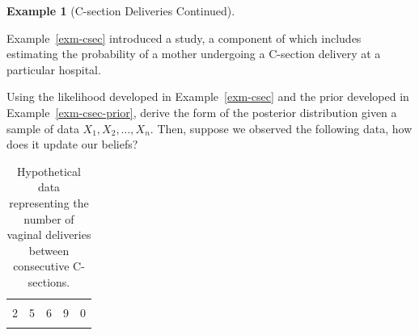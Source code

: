 \documentclass[
  letterpaper,
  DIV=11,
  numbers=noendperiod]{scrreprt}
\theoremstyle{definition}
\theoremstyle{plain}
\theoremstyle{definition}
\newtheorem{example}{Example}[chapter]
\theoremstyle{remark}
\begin{document}
\begin{example}[C-section Deliveries
Continued]\protect\hypertarget{exm-csec-posterior}{}\label{exm-csec-posterior}

Example~\ref{exm-csec} introduced a study, a component of which includes
estimating the probability of a mother undergoing a C-section delivery
at a particular hospital.

Using the likelihood developed in Example~\ref{exm-csec} and the prior
developed in Example~\ref{exm-csec-prior}, derive the form of the
posterior distribution given a sample of data \(X_1, X_2, \dotsc, X_n\).
Then, suppose we observed the following data, how does it update our
beliefs?

\hypertarget{tbl-csec-data}{}
\begin{table}
\caption{\label{tbl-csec-data}Hypothetical data representing the number of vaginal deliveries between
consecutive C-sections. }\tabularnewline

\centering
\begin{tabular}[t]{rrrrr}
\toprule
\cellcolor{gray!6}{3} & \cellcolor{gray!6}{1} & \cellcolor{gray!6}{0} & \cellcolor{gray!6}{0} & \cellcolor{gray!6}{0}\\
2 & 5 & 6 & 9 & 0\\
\cellcolor{gray!6}{5} & \cellcolor{gray!6}{1} & \cellcolor{gray!6}{0} & \cellcolor{gray!6}{1} & \cellcolor{gray!6}{0}\\
\bottomrule
\end{tabular}
\end{table}

\end{example}
\end{document}
